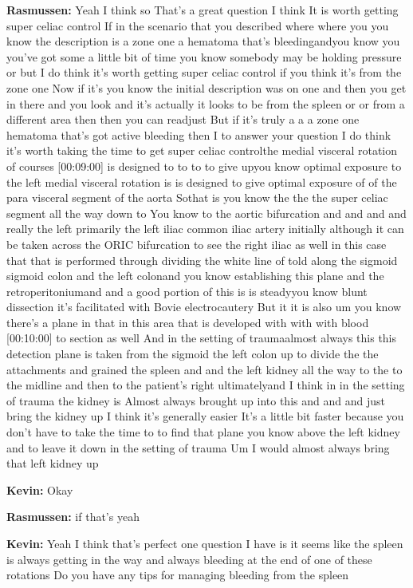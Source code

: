 \documentclass[
]{book}
\begin{document}
\textbf{Rasmussen:} Yeah I think so That's a great question I think It is
worth getting super celiac control If in the scenario that you described
where where you you know the description is a zone one a hematoma that's
bleedingandyou know you you've got some a little bit of time you know
somebody may be holding pressure or but I do think it's worth getting
super celiac control if you think it's from the zone one Now if it's you
know the initial description was on one and then you get in there and
you look and it's actually it looks to be from the spleen or or from a
different area then then you can readjust But if it's truly a a a zone
one hematoma that's got active bleeding then I to answer your question I
do think it's worth taking the time to get super celiac controlthe
medial visceral rotation of courses {[}00:09:00{]} is designed to to to to
give upyou know optimal exposure to the left medial visceral rotation is
is designed to give optimal exposure of of the para visceral segment of
the aorta Sothat is you know the the the super celiac segment all the
way down to You know to the aortic bifurcation and and and and really
the left primarily the left iliac common iliac artery initially although
it can be taken across the ORIC bifurcation to see the right iliac as
well in this case that that is performed through dividing the white line
of told along the sigmoid sigmoid colon and the left colonand you know
establishing this plane and the retroperitoniumand and a good portion of
this is is steadyyou know blunt dissection it's facilitated with Bovie
electrocautery But it it is also um you know there's a plane in that in
this area that is developed with with with blood {[}00:10:00{]} to section
as well And in the setting of traumaalmost always this this detection
plane is taken from the sigmoid the left colon up to divide the the
attachments and grained the spleen and and the left kidney all the way
to the to the midline and then to the patient's right ultimatelyand I
think in in the setting of trauma the kidney is Almost always brought up
into this and and and just bring the kidney up I think it's generally
easier It's a little bit faster because you don't have to take the time
to to find that plane you know above the left kidney and to leave it
down in the setting of trauma Um I would almost always bring that left
kidney up

\textbf{Kevin:} Okay

\textbf{Rasmussen:} if that's yeah

\textbf{Kevin:} Yeah I think that's perfect one question I have is it seems
like the spleen is always getting in the way and always bleeding at the
end of one of these rotations Do you have any tips for managing bleeding
from the spleen
\end{document}
